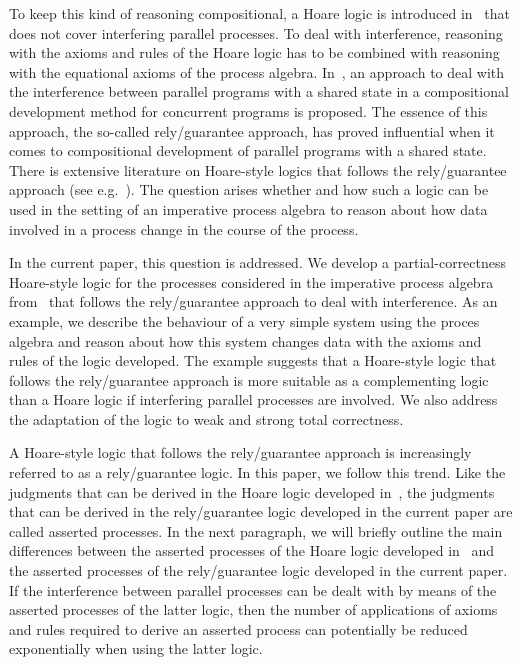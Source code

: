 \documentclass[runningheads]{llncs}
\begin{document}
To keep this kind of reasoning compositional, a Hoare logic is 
introduced in~\cite{BM19b} that does not cover interfering parallel 
processes.
To deal with interference, reasoning with the axioms and rules of the 
Hoare logic has to be combined with reasoning with the equational axioms 
of the process algebra. 
In~\cite{Jon83a}, an approach to deal with the interference between 
parallel programs with a shared state in a compositional development 
method for concurrent programs is proposed.
The essence of this approach, the so-called rely/guarantee approach, has 
proved influential when it comes to compositional development of 
parallel programs with a shared state. 
There is extensive literature on Hoare-style logics that follows the 
rely/guarantee approach 
(see e.g.~\cite{Sti88a,Sto91a,XRH97a,CJ07a,WDP10a,Sta15a,SZLY21a}).
The question arises whether and how such a logic can be used in the 
setting of an imperative process algebra to reason about how data 
involved in a process change in the course of the process.

In the current paper, this question is addressed.
We develop a partial-correct\-ness Hoare-style logic for the processes 
considered in the imperative process algebra from~\cite{BM19b} that 
follows the rely/guarantee approach to deal with interference.
As an example, we describe the behaviour of a very simple system using 
the proces algebra and reason about how this system changes data with 
the axioms and rules of the logic developed.
The example suggests that a Hoare-style logic that follows the 
rely/guarantee approach is more suitable as a complementing logic than 
a Hoare logic if interfering parallel processes are involved.
We also address the adaptation of the logic to weak and strong total
correctness.

A Hoare-style logic that follows the rely/guarantee approach is 
increasingly referred to as a rely/guarantee logic.
In this paper, we follow this trend.
Like the judgments that can be derived in the Hoare logic developed 
in~\cite{BM19b}, the judgments that can be derived in the rely/guarantee
logic developed in the current paper are called asserted processes.
In the next paragraph, we will briefly outline the main differences 
between the asserted processes of the Hoare logic developed 
in~\cite{BM19b} and the asserted processes of the rely/guarantee logic 
developed in the current paper.
If the interference between parallel processes can be dealt with by 
means of the asserted processes of the latter logic, then the number of 
applications of axioms and rules required to derive an asserted process 
can potentially be reduced exponentially when using the latter logic.
\end{document}
